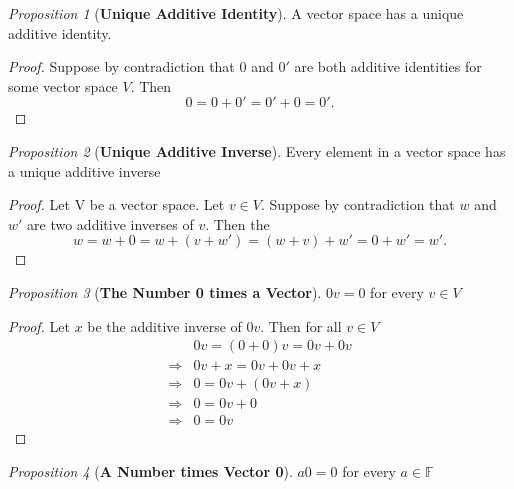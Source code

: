 \documentclass[paper=a4, fontsize=11pt]{scrartcl}
\numberwithin{equation}{section}		%
\numberwithin{figure}{section}			%
\numberwithin{table}{section}				%
\theoremstyle{definition}
\theoremstyle{remark}
\theoremstyle{example}
\newtheorem{prop}{Proposition}[section]
\begin{document}
\begin{prop}[\textbf{Unique Additive Identity}]
    A vector space has a unique additive identity.
\end{prop}

\begin{proof}
    Suppose by contradiction that $0$ and $0'$ are both additive identities for some vector space $V$. Then
    \begin{equation}
        0 = 0 + 0' = 0' + 0 = 0'.
    \end{equation}
\end{proof}

\begin{prop}[\textbf{Unique Additive Inverse}]
    Every element in a vector space has a unique additive inverse
\end{prop}

\begin{proof}
    Let V be a vector space. Let $v \in V$. Suppose by contradiction that $w$ and $w'$ are two additive inverses of $v$. Then the
    \begin{equation}
        w = w + 0 = w + (v + w') = (w + v) + w' = 0 + w' = w'.
    \end{equation}
\end{proof}

\begin{prop}[\textbf{The Number 0 times a Vector}]
    $0v = 0$ for every $v \in V$
\end{prop}

\begin{proof}
    Let $x$ be the additive inverse of $0v$. Then for all $v \in V$
    \begin{equation}
        \begin{aligned}
            &0v = (0 + 0)v = 0v + 0v\\
            \Rightarrow &0v + x = 0v + 0v + x\\
            \Rightarrow &0 = 0v + (0v + x)\\
            \Rightarrow &0 = 0v + 0\\
            \Rightarrow &0 = 0v
        \end{aligned}
    \end{equation}
\end{proof}

\begin{prop}[\textbf{A Number times Vector 0}]
    $a0 = 0$ for every $a \in \mathbb{F}$
\end{prop}
\end{document}
